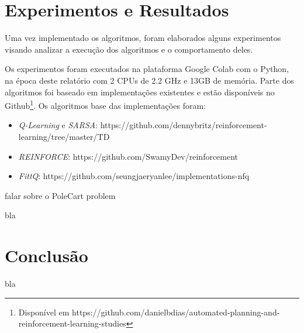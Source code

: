 \documentclass[letterpaper]{article}
\begin{document}
\section{Experimentos e Resultados}

Uma vez implementado os algoritmos, foram elaborados alguns experimentos visando analizar a execução dos algoritmos e o comportamento deles.

Os experimentos foram executados na plataforma Google Colab com o Python, na época deste relatório com 2 CPUs de 2.2 GHz e 13GB de memória.
Parte dos algoritmos foi baseado em implementações existentes e estão disponíveis no Github\footnote{Disponível em https://github.com/danielbdias/automated-planning-and-reinforcement-learning-studies}.
Os algoritmos base das implementações foram:

\begin{itemize}
  \item \textit{Q-Learning} e \textit{SARSA}: https://github.com/dennybritz/reinforcement-learning/tree/master/TD
  \item \textit{REINFORCE}: https://github.com/SwamyDev/reinforcement
  \item \textit{FittQ}: https://github.com/seungjaeryanlee/implementations-nfq
\end{itemize}

falar sobre o PoleCart problem

bla

\section{Conclusão}

bla



\end{document}
